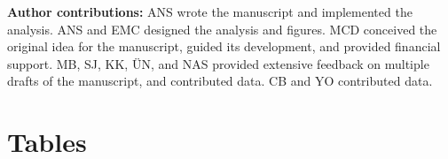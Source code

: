 \documentclass{article}
\begin{document}
\vspace{5mm}

\noindent
\textbf{Author contributions:}
ANS wrote the manuscript and implemented the analysis.
ANS and EMC designed the analysis and figures.
MCD conceived the original idea for the manuscript, guided its development, and provided financial support.
MB, SJ, KK, ÜN, and NAS provided extensive feedback on multiple drafts of the manuscript, and contributed data.
CB and YO contributed data.

\pagebreak

\section*{Tables}

\begin{table}[!h]


\end{table}
\end{document}
